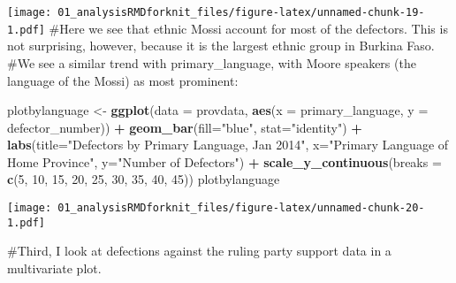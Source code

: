 \documentclass[]{article}
\newenvironment{Shaded}{\begin{snugshade}}{\end{snugshade}}
\newcommand{\DataTypeTok}[1]{\textcolor[rgb]{0.13,0.29,0.53}{#1}}
\newcommand{\DecValTok}[1]{\textcolor[rgb]{0.00,0.00,0.81}{#1}}
\newcommand{\KeywordTok}[1]{\textcolor[rgb]{0.13,0.29,0.53}{\textbf{#1}}}
\newcommand{\NormalTok}[1]{#1}
\newcommand{\OperatorTok}[1]{\textcolor[rgb]{0.81,0.36,0.00}{\textbf{#1}}}
\newcommand{\StringTok}[1]{\textcolor[rgb]{0.31,0.60,0.02}{#1}}
\begin{document}
\texttt{[image: 01\_analysisRMDforknit\_files/figure-latex/unnamed-chunk-19-1.pdf]}
\#Here we see that ethnic Mossi account for most of the defectors. This
is not surprising, however, because it is the largest ethnic group in
Burkina Faso. \#We see a similar trend with primary\_language, with
Moore speakers (the language of the Mossi) as most prominent:

\begin{Shaded}
\begin{Highlighting}[]
\NormalTok{plotbylanguage <{-}}\StringTok{ }\KeywordTok{ggplot}\NormalTok{(}\DataTypeTok{data =}\NormalTok{ provdata, }\KeywordTok{aes}\NormalTok{(}\DataTypeTok{x =}\NormalTok{ primary\_language, }\DataTypeTok{y =}\NormalTok{ defector\_number)) }\OperatorTok{+}
\StringTok{  }\KeywordTok{geom\_bar}\NormalTok{(}\DataTypeTok{fill=}\StringTok{"blue"}\NormalTok{, }\DataTypeTok{stat=}\StringTok{"identity"}\NormalTok{) }\OperatorTok{+}\StringTok{ }\KeywordTok{labs}\NormalTok{(}\DataTypeTok{title=}\StringTok{"Defectors by Primary Language, Jan 2014"}\NormalTok{, }\DataTypeTok{x=}\StringTok{"Primary Language of Home Province"}\NormalTok{, }\DataTypeTok{y=}\StringTok{"Number of Defectors"}\NormalTok{) }\OperatorTok{+}\StringTok{ }\KeywordTok{scale\_y\_continuous}\NormalTok{(}\DataTypeTok{breaks =} \KeywordTok{c}\NormalTok{(}\DecValTok{5}\NormalTok{, }\DecValTok{10}\NormalTok{, }\DecValTok{15}\NormalTok{, }\DecValTok{20}\NormalTok{, }\DecValTok{25}\NormalTok{, }\DecValTok{30}\NormalTok{, }\DecValTok{35}\NormalTok{, }\DecValTok{40}\NormalTok{, }\DecValTok{45}\NormalTok{))}
\NormalTok{plotbylanguage}
\end{Highlighting}
\end{Shaded}

\texttt{[image: 01\_analysisRMDforknit\_files/figure-latex/unnamed-chunk-20-1.pdf]}

\#Third, I look at defections against the ruling party support data in a
multivariate plot.
\end{document}
